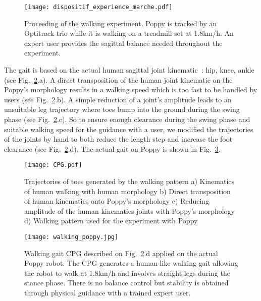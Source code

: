 \begin{figure}[tb]
    \centering
    \texttt{[image: dispositif\_experience\_marche.pdf]}
    \caption{Proceeding of the walking experiment.
    Poppy is tracked by an Optitrack trio while it is walking on a treadmill set at 1.8km/h.
    An expert user provides the sagittal balance needed throughout the experiment.}
    \label{fig:walking_experiment}
\end{figure}


The gait is based on the actual human sagittal joint kinematic~\parencite{Nester2003}: hip, knee, ankle (see Fig.~\ref{fig:CPG}.a). A direct transposition of the human joint kinematic on the Poppy's morphology results in a walking speed which is too fast to be handled by users (see Fig.~\ref{fig:CPG}.b). A simple reduction of a joint’s amplitude leads to an unsuitable leg trajectory where toes bump into the ground during the swing phase (see Fig.~\ref{fig:CPG}.c). So to ensure enough clearance during the swing phase and suitable walking speed for the guidance with a user, we modified the trajectories of the joints by hand to both reduce the length step and increase the foot clearance (see Fig.~\ref{fig:CPG}.d). The actual gait on Poppy is shown in Fig.~\ref{fig:humanoids2013_cpg_on_poppy}.


\begin{figure}[tb]
    \centering
    \texttt{[image: CPG.pdf]}
    \caption{Trajectories of toes generated by the walking pattern a) Kinematics of human walking
    with human morphology b) Direct transposition of human kinematics onto Poppy's morphology
    c) Reducing amplitude of the human kinematics joints with Poppy's morphology d) Walking pattern
    used for the experiment with Poppy}
    \label{fig:CPG}
\end{figure}

\begin{figure}[tb]
    \centering
    \texttt{[image: walking\_poppy.jpg]}
    \caption{Walking gait CPG described on Fig.~\ref{fig:CPG}.d applied on the actual Poppy robot.
    The CPG generates a human-like walking gait allowing the robot to walk at 1.8km/h and involves straight legs during the stance phase.
    There is no balance control but stability is obtained through physical guidance with a trained expert user.}
    \label{fig:humanoids2013_cpg_on_poppy}
\end{figure}

